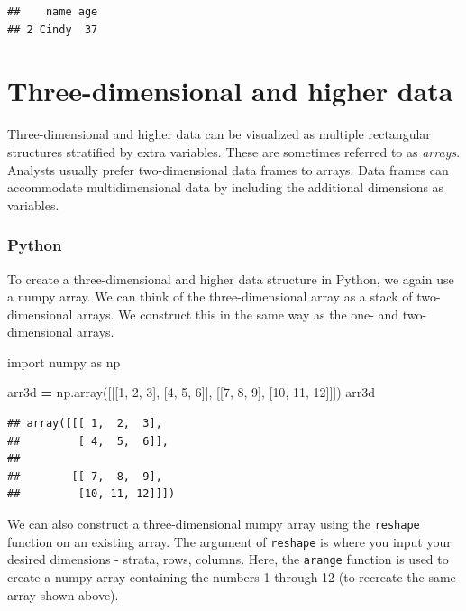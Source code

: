 \documentclass[
]{book}
\newenvironment{Shaded}{\begin{snugshade}}{\end{snugshade}}
\newcommand{\DecValTok}[1]{\textcolor[rgb]{0.00,0.00,0.81}{#1}}
\newcommand{\ImportTok}[1]{#1}
\newcommand{\NormalTok}[1]{#1}
\newcommand{\OperatorTok}[1]{\textcolor[rgb]{0.81,0.36,0.00}{\textbf{#1}}}
\begin{document}
\begin{verbatim}
##    name age
## 2 Cindy  37
\end{verbatim}

\hypertarget{three-dimensional-and-higher-data}{%
\section{Three-dimensional and higher data}\label{three-dimensional-and-higher-data}}

Three-dimensional and higher data can be visualized as multiple rectangular structures stratified by extra variables. These are sometimes referred to as \emph{arrays}. Analysts usually prefer two-dimensional data frames to arrays. Data frames can accommodate multidimensional data by including the additional dimensions as variables.

\hypertarget{python-10}{%
\subsubsection*{Python}\label{python-10}}

To create a three-dimensional and higher data structure in Python, we again use a numpy array. We can think of the three-dimensional array as a stack of two-dimensional arrays. We construct this in the same way as the one- and two-dimensional arrays.

\begin{Shaded}
\begin{Highlighting}[]
\ImportTok{import}\NormalTok{ numpy }\ImportTok{as}\NormalTok{ np }

\NormalTok{arr3d }\OperatorTok{=}\NormalTok{ np.array([[[}\DecValTok{1}\NormalTok{, }\DecValTok{2}\NormalTok{, }\DecValTok{3}\NormalTok{], [}\DecValTok{4}\NormalTok{, }\DecValTok{5}\NormalTok{, }\DecValTok{6}\NormalTok{]], [[}\DecValTok{7}\NormalTok{, }\DecValTok{8}\NormalTok{, }\DecValTok{9}\NormalTok{], [}\DecValTok{10}\NormalTok{, }\DecValTok{11}\NormalTok{, }\DecValTok{12}\NormalTok{]]])}
\NormalTok{arr3d}
\end{Highlighting}
\end{Shaded}

\begin{verbatim}
## array([[[ 1,  2,  3],
##         [ 4,  5,  6]],
## 
##        [[ 7,  8,  9],
##         [10, 11, 12]]])
\end{verbatim}

We can also construct a three-dimensional numpy array using the \texttt{reshape} function on an existing array. The argument of \texttt{reshape} is where you input your desired dimensions - strata, rows, columns. Here, the \texttt{arange} function is used to create a numpy array containing the numbers 1 through 12 (to recreate the same array shown above).
\end{document}

